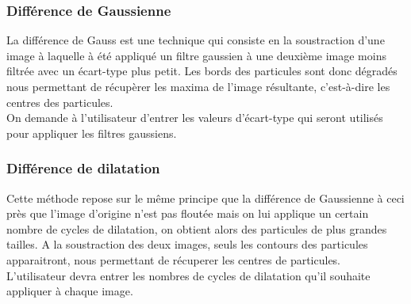 \subsubsection{Différence de Gaussienne}
La différence de Gauss est une technique qui consiste en la soustraction d'une image à laquelle à été appliqué un filtre gaussien à une deuxième image moins filtrée avec un écart-type plus petit. Les bords des particules sont donc dégradés nous permettant de récupèrer les maxima de l'image résultante, c'est-à-dire les centres des particules.\\
\noindent
On demande à l'utilisateur d'entrer les valeurs d'écart-type qui seront utilisés pour appliquer les filtres gaussiens.

\subsubsection{Différence de dilatation}

Cette méthode repose sur le même principe que la différence de Gaussienne à ceci près que l'image d'origine n'est pas floutée mais on lui applique un certain nombre de cycles de dilatation, on obtient alors des particules de plus grandes tailles. A la soustraction des deux images, seuls les contours des particules apparaitront, nous permettant de récuperer les centres de particules.\\
L'utilisateur devra entrer les nombres de cycles de dilatation qu'il souhaite appliquer à chaque image.


%

